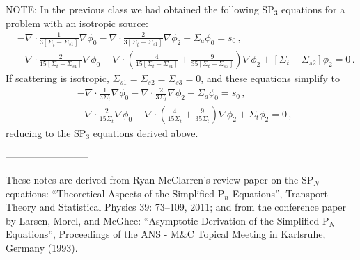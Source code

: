 \documentclass[12pt]{article}
\begin{document}
NOTE: In the previous class we had obtained the following SP$_3$ equations for a problem with an isotropic source:
\begin{align*}
&-\nabla \cdot \frac{1}{3[\Sigma_t-\Sigma_{s1}]}\nabla\phi_0
-\nabla \cdot \frac{2}{3[\Sigma_t-\Sigma_{s1}]}\nabla\phi_2
+\Sigma_a\phi_0 = s_0\,,\\
&-\nabla \cdot \frac{2}{15[\Sigma_t-\Sigma_{s1}]}\nabla\phi_0
-\nabla \cdot \left(\frac{4}{15[\Sigma_t-\Sigma_{s1}]}+\frac{9}{35[\Sigma_t-\Sigma_{s3}]}\right)\nabla\phi_2
+[\Sigma_t-\Sigma_{s2}]\phi_2 = 0\,.
 \end{align*}
If scattering is isotropic, $\Sigma_{s1} = \Sigma_{s2} = \Sigma_{s3} = 0$, and these equations simplify to
\begin{align*}
&-\nabla \cdot \frac{1}{3\Sigma_t}\nabla\phi_0
-\nabla \cdot \frac{2}{3\Sigma_t}\nabla\phi_2
+\Sigma_a\phi_0 = s_0\,,\\
&-\nabla \cdot \frac{2}{15\Sigma_t}\nabla\phi_0
-\nabla \cdot \left(\frac{4}{15\Sigma_t}+\frac{9}{35\Sigma_t}\right)\nabla\phi_2
+\Sigma_t\phi_2 = 0\,,
 \end{align*}
 reducing to the SP$_3$ equations derived above.
 
 
 
--------------------------

\vfill

These notes are derived from Ryan McClarren's review paper on the SP$_N$ equations: ``Theoretical Aspects of the Simplified P$_n$ Equations'', Transport Theory and Statistical Physics 39: 73--109, 2011; and from the conference paper by Larsen, Morel, and McGhee: ``Asymptotic Derivation of the Simplified P$_N$ Equations'', Proceedings of the ANS - M\&C Topical Meeting in Karlsruhe, Germany (1993).
\end{document}

